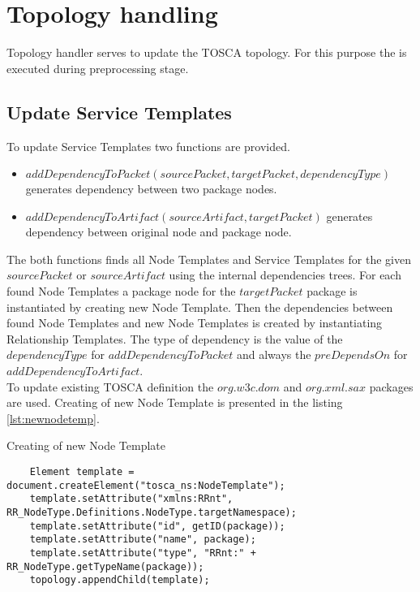 \section{Topology handling}\label{sec:imptophan}
Topology handler serves to update the TOSCA topology.
For this purpose the  is executed during preprocessing stage.

\subsection*{Update Service Templates}
To update Service Templates two functions are provided.
\begin{itemize}
	\item $addDependencyToPacket(sourcePacket,targetPacket,dependencyType)$ generates dependency between two package nodes.
	\item $addDependencyToArtifact(sourceArtifact, targetPacket)$ generates dependency between original node and package node.
\end{itemize} 
The both functions finds all Node Templates and Service Templates for the given $sourcePacket$ or $sourceArtifact$ using the internal dependencies trees.
For each found Node Templates a package node for the $targetPacket$ package is instantiated by creating new Node Template.
Then the dependencies between found Node Templates and new Node Templates is created by instantiating Relationship Templates.
The type of dependency is the value of the $dependencyType$ for $addDependencyToPacket$ and always the $preDependsOn$ for $addDependencyToArtifact$.\\
To update existing TOSCA definition the $org$.$w3c$.$dom$ and $org$.$xml$.$sax$ packages are used. 
Creating of new Node Template is presented in the listing \ref{lst:newnodetemp}.
\begin{Listing}
	\caption{Creating of new Node Template}
	\label{lst:newnodetemp}
	\begin{lstlisting}  
	Element template = document.createElement("tosca_ns:NodeTemplate");
	template.setAttribute("xmlns:RRnt", RR_NodeType.Definitions.NodeType.targetNamespace);
	template.setAttribute("id", getID(package));
	template.setAttribute("name", package);
	template.setAttribute("type", "RRnt:" + RR_NodeType.getTypeName(package));
	topology.appendChild(template);
	\end{lstlisting}
\end{Listing}

